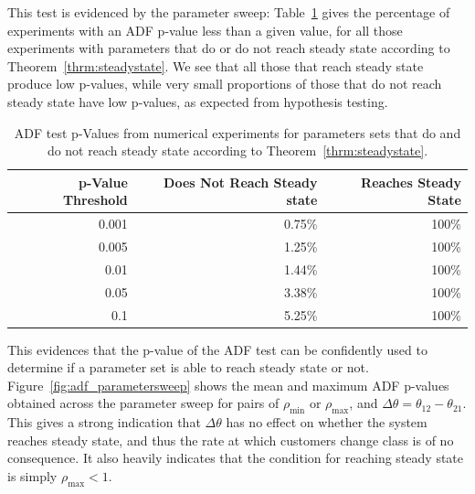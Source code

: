 \documentclass{article}
\begin{document}
This test is evidenced by the parameter sweep: Table~\ref{tbl:adf_pvals} gives
the percentage of experiments with an ADF p-value less than a given value, for
all those experiments with parameters that do or do not reach steady state
according to Theorem~\ref{thrm:steadystate}. We see that all those that reach
steady state produce low p-values, while very small proportions of those that
do not reach steady state have low p-values, as expected from hypothesis
testing.

\begin{table}
\begin{center}
\begin{tabular}{rrr}
\toprule
p-Value Threshold & Does Not Reach Steady state & Reaches Steady State \\
\midrule
0.001 & 0.75\% & 100\% \\
0.005 & 1.25\% & 100\% \\
0.01 & 1.44\% & 100\% \\
0.05 & 3.38\% & 100\% \\
0.1 & 5.25\% & 100\% \\
\bottomrule
\end{tabular}
\caption{ADF test p-Values from numerical experiments for parameters sets that
do and do not reach steady state according to Theorem~\ref{thrm:steadystate}.} 
\label{tbl:adf_pvals}
\end{center}
\end{table}

This evidences that the p-value of the ADF test can be confidently used to
determine if a parameter set is able to reach steady state or not.
Figure~\ref{fig:adf_parametersweep} shows the mean and maximum ADF p-values
obtained across the parameter sweep for pairs of $\rho_{\text{min}}$ or
$\rho_{\text{max}}$, and $\Delta\theta = \theta_{12} - \theta_{21}$.
This gives a strong indication that $\Delta\theta$ has no effect on whether
the system reaches steady state, and thus the rate at which customers change
class is of no consequence. It also heavily indicates that the condition for
reaching steady state is simply $\rho_{\max} < 1$.
\end{document}
